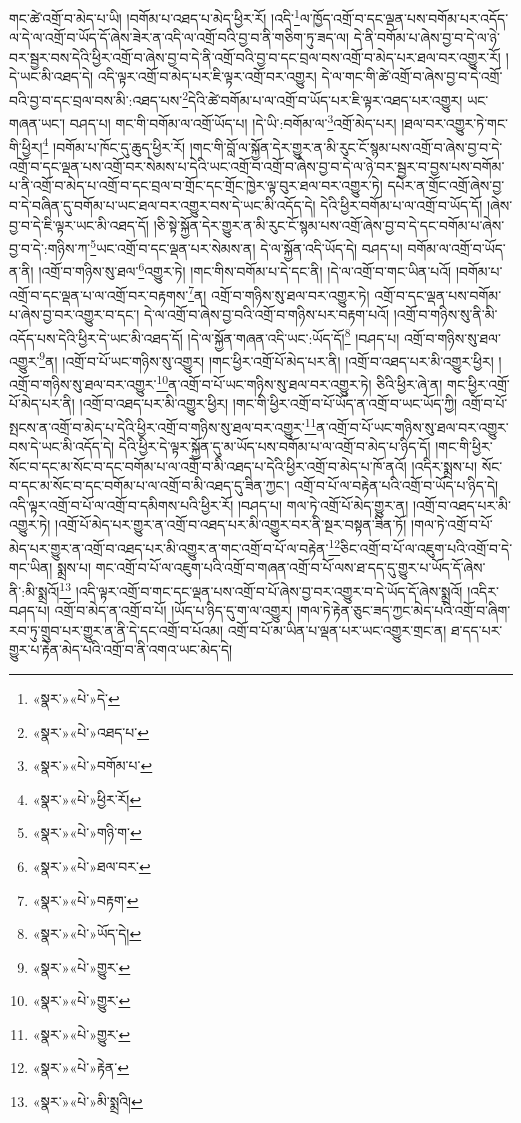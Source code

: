 གང་ཚེ་འགྲོ་བ་མེད་པ་ཡི། །བགོམ་པ་འཐད་པ་མེད་ཕྱིར་རོ། །འདི་\footnote{«སྣར་»«པེ་»དེ་}ལ་ཁྱོད་འགྲོ་བ་དང་ལྡན་པས་བགོམ་པར་འདོད་ལ་དེ་ལ་འགྲོ་བ་ཡོད་དོ་ཞེས་ཟེར་ན་འདི་ལ་འགྲོ་བའི་བྱ་བ་ནི་གཅིག་ཏུ་ཟད་ལ། དེ་ནི་བགོམ་པ་ཞེས་བྱ་བ་དེ་ལ་ཉེ་བར་སྦྱར་བས་དེའི་ཕྱིར་འགྲོ་བ་ཞེས་བྱ་བ་དེ་ནི་འགྲོ་བའི་བྱ་བ་དང་བྲལ་བས་འགྲོ་བ་མེད་པར་ཐལ་བར་འགྱུར་རོ། །དེ་ཡང་མི་འཐད་དེ། འདི་ལྟར་འགྲོ་བ་མེད་པར་ཇི་ལྟར་འགྲོ་བར་འགྱུར། དེ་ལ་གང་གི་ཚེ་འགྲོ་བ་ཞེས་བྱ་བ་དེ་འགྲོ་བའི་བྱ་བ་དང་བྲལ་བས་མི་:འཐད་པས་\footnote{«སྣར་»«པེ་»འཐད་པ་}དེའི་ཚེ་བགོམ་པ་ལ་འགྲོ་བ་ཡོད་པར་ཇི་ལྟར་འཐད་པར་འགྱུར། ཡང་གཞན་ཡང་། བཤད་པ། གང་གི་བགོམ་ལ་འགྲོ་ཡོད་པ། །དེ་ཡི་:བགོམ་ལ་\footnote{«སྣར་»«པེ་»བགོམ་པ་}འགྲོ་མེད་པར། །ཐལ་བར་འགྱུར་ཏེ་གང་གི་ཕྱིར།\footnote{«སྣར་»«པེ་»ཕྱིར་རོ།} །བགོམ་པ་ཁོང་དུ་ཆུད་ཕྱིར་རོ། །གང་གི་བློ་ལ་སྐྱོན་དེར་གྱུར་ན་མི་རུང་ངོ་སྙམ་པས་འགྲོ་བ་ཞེས་བྱ་བ་དེ་འགྲོ་བ་དང་ལྡན་པས་འགྲོ་བར་སེམས་པ་དེའི་ཡང་འགྲོ་བ་འགྲོ་བ་ཞེས་བྱ་བ་དེ་ལ་ཉེ་བར་སྦྱར་བ་བྱས་པས་བགོམ་པ་ནི་འགྲོ་བ་མེད་པ་འགྲོ་བ་དང་བྲལ་བ་གྲོང་དང་གྲོང་ཁྱེར་ལྟ་བུར་ཐལ་བར་འགྱུར་ཏེ། དཔེར་ན་གྲོང་འགྲོ་ཞེས་བྱ་བ་དེ་བཞིན་དུ་བགོམ་པ་ཡང་ཐལ་བར་འགྱུར་བས་དེ་ཡང་མི་འདོད་དེ། དེའི་ཕྱིར་བགོམ་པ་ལ་འགྲོ་བ་ཡོད་དོ། །ཞེས་བྱ་བ་དེ་ཇི་ལྟར་ཡང་མི་འཐད་དོ། །ཅི་སྟེ་སྐྱོན་དེར་གྱུར་ན་མི་རུང་ངོ་སྙམ་པས་འགྲོ་ཞེས་བྱ་བ་དེ་དང་བགོམ་པ་ཞེས་བྱ་བ་དེ་:གཉིས་ཀ་\footnote{«སྣར་»«པེ་»གཉི་ག་}ཡང་འགྲོ་བ་དང་ལྡན་པར་སེམས་ན། དེ་ལ་སྐྱོན་འདི་ཡོད་དེ། བཤད་པ། བགོམ་ལ་འགྲོ་བ་ཡོད་ན་ནི། །འགྲོ་བ་གཉིས་སུ་ཐལ་\footnote{«སྣར་»«པེ་»ཐལ་བར་}འགྱུར་ཏེ། །གང་གིས་བགོམ་པ་དེ་དང་ནི། །དེ་ལ་འགྲོ་བ་གང་ཡིན་པའོ། །བགོམ་པ་འགྲོ་བ་དང་ལྡན་པ་ལ་འགྲོ་བར་བརྟགས་\footnote{«སྣར་»«པེ་»བརྟག་}ན། འགྲོ་བ་གཉིས་སུ་ཐལ་བར་འགྱུར་ཏེ། འགྲོ་བ་དང་ལྡན་པས་བགོམ་པ་ཞེས་བྱ་བར་འགྱུར་བ་དང་། དེ་ལ་འགྲོ་བ་ཞེས་བྱ་བའི་འགྲོ་བ་གཉིས་པར་བརྟག་པའོ། །འགྲོ་བ་གཉིས་སུ་ནི་མི་འདོད་པས་དེའི་ཕྱིར་དེ་ཡང་མི་འཐད་དོ། །དེ་ལ་སྐྱོན་གཞན་འདི་ཡང་:ཡོད་དོ།\footnote{«སྣར་»«པེ་»ཡོད་དེ།} །བཤད་པ། འགྲོ་བ་གཉིས་སུ་ཐལ་འགྱུར་\footnote{«སྣར་»«པེ་»གྱུར་}ན། །འགྲོ་བ་པོ་ཡང་གཉིས་སུ་འགྱུར། །གང་ཕྱིར་འགྲོ་པོ་མེད་པར་ནི། །འགྲོ་བ་འཐད་པར་མི་འགྱུར་ཕྱིར། །འགྲོ་བ་གཉིས་སུ་ཐལ་བར་འགྱུར་\footnote{«སྣར་»«པེ་»གྱུར་}ན་འགྲོ་བ་པོ་ཡང་གཉིས་སུ་ཐལ་བར་འགྱུར་ཏེ། ཅིའི་ཕྱིར་ཞེ་ན། གང་ཕྱིར་འགྲོ་པོ་མེད་པར་ནི། །འགྲོ་བ་འཐད་པར་མི་འགྱུར་ཕྱིར། །གང་གི་ཕྱིར་འགྲོ་བ་པོ་ཡོད་ན་འགྲོ་བ་ཡང་ཡོད་ཀྱི། འགྲོ་བ་པོ་སྤངས་ན་འགྲོ་བ་མེད་པ་དེའི་ཕྱིར་འགྲོ་བ་གཉིས་སུ་ཐལ་བར་འགྱུར་\footnote{«སྣར་»«པེ་»གྱུར་}ན་འགྲོ་བ་པོ་ཡང་གཉིས་སུ་ཐལ་བར་འགྱུར་བས་དེ་ཡང་མི་འདོད་དེ། དེའི་ཕྱིར་དེ་ལྟར་སྐྱོན་དུ་མ་ཡོད་པས་བགོམ་པ་ལ་འགྲོ་བ་མེད་པ་ཉིད་དོ། །གང་གི་ཕྱིར་སོང་བ་དང་མ་སོང་བ་དང་བགོམ་པ་ལ་འགྲོ་བ་མི་འཐད་པ་དེའི་ཕྱིར་འགྲོ་བ་མེད་པ་ཁོ་ནའོ། །འདིར་སྨྲས་པ། སོང་བ་དང་མ་སོང་བ་དང་བགོམ་པ་ལ་འགྲོ་བ་མི་འཐད་དུ་ཟིན་ཀྱང་། འགྲོ་བ་པོ་ལ་བརྟེན་པའི་འགྲོ་བ་ཡོད་པ་ཉིད་དེ། འདི་ལྟར་འགྲོ་བ་པོ་ལ་འགྲོ་བ་དམིགས་པའི་ཕྱིར་རོ། །བཤད་པ། གལ་ཏེ་འགྲོ་པོ་མེད་གྱུར་ན། །འགྲོ་བ་འཐད་པར་མི་འགྱུར་ཏེ། །འགྲོ་པོ་མེད་པར་གྱུར་ན་འགྲོ་བ་འཐད་པར་མི་འགྱུར་བར་ནི་སྔར་བསྟན་ཟིན་ཏོ། །གལ་ཏེ་འགྲོ་བ་པོ་མེད་པར་གྱུར་ན་འགྲོ་བ་འཐད་པར་མི་འགྱུར་ན་གང་འགྲོ་བ་པོ་ལ་བརྟེན་\footnote{«སྣར་»«པེ་»རྟེན་}ཅིང་འགྲོ་བ་པོ་ལ་འཇུག་པའི་འགྲོ་བ་དེ་གང་ཡིན། སྨྲས་པ། གང་འགྲོ་བ་པོ་ལ་འཇུག་པའི་འགྲོ་བ་གཞན་འགྲོ་བ་པོ་ལས་ཐ་དད་དུ་གྱུར་པ་ཡོད་དོ་ཞེས་ནི་:མི་སྨྲའོ།\footnote{«སྣར་»«པེ་»མི་སྨྲའི།} །འདི་ལྟར་འགྲོ་བ་གང་དང་ལྡན་པས་འགྲོ་བ་པོ་ཞེས་བྱ་བར་འགྱུར་བ་དེ་ཡོད་དོ་ཞེས་སྨྲའོ། །འདིར་བཤད་པ། འགྲོ་བ་མེད་ན་འགྲོ་བ་པོ། །ཡོད་པ་ཉིད་དུ་ག་ལ་འགྱུར། །གལ་ཏེ་རྟེན་ཅུང་ཟད་ཀྱང་མེད་པའི་འགྲོ་བ་ཞིག་རབ་ཏུ་གྲུབ་པར་གྱུར་ན་ནི་དེ་དང་འགྲོ་བ་པོའམ། འགྲོ་བ་པོ་མ་ཡིན་པ་ལྡན་པར་ཡང་འགྱུར་གྲང་ན། ཐ་དད་པར་གྱུར་པ་རྟེན་མེད་པའི་འགྲོ་བ་ནི་འགའ་ཡང་མེད་དེ། 